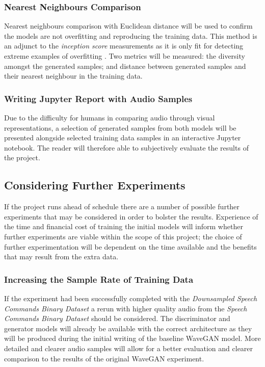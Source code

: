 \documentclass[a4paper, dvipsnames, titlepage]{article}
\begin{document}
\subsubsection{Nearest Neighbours Comparison}

Nearest neighbours comparison with Euclidean distance will be used to confirm the models are not overfitting and reproducing the training data.
This method is an adjunct to the \textit{inception score} measurements as it is only fit for detecting extreme examples of overfitting \citep{2015arXiv151101844T}.
Two metrics will be measured: the diversity amongst the generated samples; and distance between generated samples and their nearest neighbour in the training data.

\subsubsection{Writing Jupyter Report with Audio Samples}

Due to the difficulty for humans in comparing audio through visual representations, a selection of generated samples from both models will be presented alongside selected training data samples in an interactive Jupyter notebook.
The reader will therefore able to subjectively evaluate the results of the project.

\subsection{Considering Further Experiments}

If the project runs ahead of schedule there are a number of possible further experiments that may be considered in order to bolster the results.
Experience of the time and financial cost of training the initial models will inform whether further experiments are viable within the scope of this project; the choice of further experimentation will be dependent on the time available and the benefits that may result from the extra data.

\subsubsection{Increasing the Sample Rate of Training Data}

If the experiment had been successfully completed with the \textit{Downsampled Speech Commands Binary Dataset} a rerun with higher quality audio from the \textit{Speech Commands Binary Dataset} should be considered.
The discriminator and generator models will already be available with the correct architecture as they will be produced during the initial writing of the baseline WaveGAN model.
More detailed and clearer audio samples will allow for a better evaluation and clearer comparison to the results of the original WaveGAN experiment.
\end{document}

